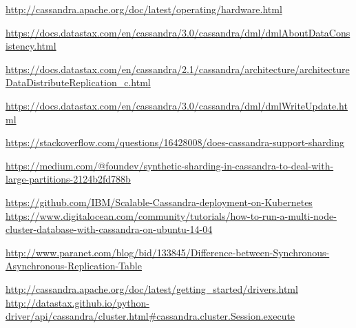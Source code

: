\documentclass[a4paper]{article}
\begin{document}
\begin{thebibliography}{9}

\href{Cassandra Hardware specs}{http://cassandra.apache.org/doc/latest/operating/hardware.html}

\href{Consistency-cassandra}{https://docs.datastax.com/en/cassandra/3.0/cassandra/dml/dmlAboutDataConsistency.html}

\href{replication}{https://docs.datastax.com/en/cassandra/2.1/cassandra/architecture\newline/architectureDataDistributeReplication\_c.html}

\href{write-update}{https://docs.datastax.com/en/cassandra/3.0/cassandra/dml/dmlWriteUpdate.html}

\href{sharding-1}{https://stackoverflow.com/questions/16428008/does-cassandra-support-sharding}

\href{sharding-2}{https://medium.com/@foundev/synthetic-sharding-in-cassandra-to-deal-with-large-partitions-2124b2fd788b}

\href{IBM-git}{https://github.com/IBM/Scalable-Cassandra-deployment-on-Kubernetes}
\href{multinode}{https://www.digitalocean.com/community/tutorials/how-to-run-a-multi-node-cluster-database-with-cassandra-on-ubuntu-14-04}

\href{async-repl}{http://www.paranet.com/blog/bid/133845/Difference-between-Synchronous-Asynchronous-Replication-Table}

\href{drivers}{http://cassandra.apache.org/doc/latest/getting\_started/drivers.html
}
\href{async}{http://datastax.github.io/python-driver/api/cassandra/cluster.html\newline\#cassandra.cluster.Session.execute}

\end{thebibliography}
\end{document}
